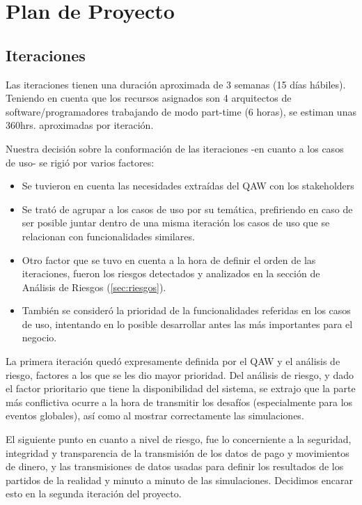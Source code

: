 \section{Plan de Proyecto}
\label{sec:planificacion}
\subsection{Iteraciones}
Las iteraciones tienen una duración aproximada de 3 semanas (15 días hábiles). Teniendo en cuenta que los recursos asignados son 4 arquitectos de software/programadores trabajando de modo part-time (6 horas), se estiman unas 360hrs. aproximadas por iteración.

Nuestra decisión sobre la conformación de las iteraciones -en cuanto a los casos de uso- se rigió por varios factores: 
\begin{itemize}
\item Se tuvieron en cuenta las necesidades extraídas del QAW con los stakeholders
\item Se trató de agrupar a los casos de uso por su temática, prefiriendo en caso de ser posible juntar dentro de una misma iteración los casos de uso que se relacionan con funcionalidades similares.
\item Otro factor que se tuvo en cuenta a la hora de definir el orden de las iteraciones, fueron los riesgos detectados y analizados en la sección de Análisis de Riesgos (\ref{sec:riesgos}).
\item También se consideró la prioridad de la funcionalidades referidas en los casos de uso, intentando en lo posible desarrollar antes las más importantes para el negocio.
\end{itemize}

La primera iteración quedó expresamente definida por el QAW y el análisis de riesgo, factores a los que se les dio mayor prioridad. 
Del análisis de riesgo, y dado el factor prioritario que tiene la disponibilidad del sistema, se extrajo que la parte más conflictiva ocurre a la hora de transmitir los desafíos (especialmente para los eventos globales), así como al mostrar correctamente las simulaciones.

El siguiente punto en cuanto a nivel de riesgo, fue lo concerniente a la seguridad, integridad y transparencia de la transmisión de los datos de pago y movimientos de dinero, y las transmisiones de datos usadas para definir los resultados de los partidos de la realidad y minuto a minuto de las simulaciones. Decidimos encarar esto en la segunda iteración del proyecto.

